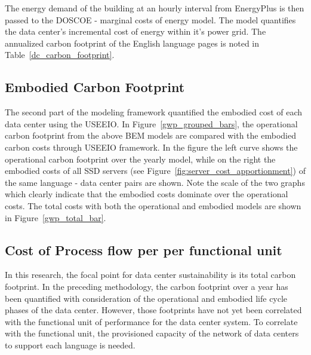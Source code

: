     
    
    The energy demand of the building at an hourly interval from EnergyPlus is then passed to the DOSCOE - marginal costs of energy model. The model quantifies the data center's incremental cost of energy within it's power grid. The annualized carbon footprint of the English language pages is noted in Table~\ref{dc_carbon_footprint}.

    
    
    
    \subsection{Embodied Carbon Footprint}
    The second part of the modeling framework quantified the embodied cost of each data center using the USEEIO. In Figure~\ref{gwp_grouped_bars}, the operational carbon footprint from the above BEM models are compared with the embodied carbon costs through USEEIO framework. In the figure the left curve shows the operational carbon footprint over the yearly model, while on the right the embodied costs of all SSD servers (see Figure~\ref{fig:server_cost_apportionment}) of the same language - data center pairs are shown. Note the scale of the two graphs which clearly indicate that the embodied costs dominate over the operational costs. The total costs with both the operational and embodied models are shown in Figure~\ref{gwp_total_bar}.
    
    
    
    
    
    
    \subsection{Cost of Process flow per per functional unit}

    In this research, the focal point for data center sustainability is its total carbon footprint. In the preceding methodology, the carbon footprint over a year has been quantified with consideration of the operational and embodied life cycle phases of the data center. However, those footprints have not yet been correlated with the functional unit of performance for the data center system. To correlate with the functional unit, the provisioned capacity of the network of data centers to support each language is needed. 
    
